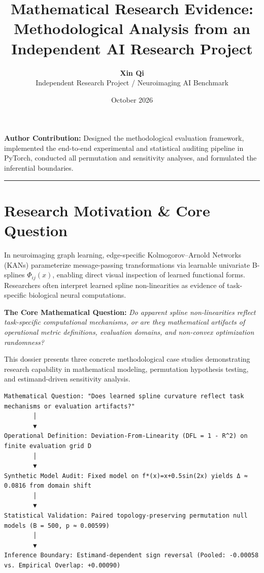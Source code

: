 \documentclass[11pt,a4paper]{article}
\title{\textbf{Mathematical Research Evidence: Methodological Analysis from an Independent AI Research Project}}
\author{\textbf{Xin Qi} \\ Independent Research Project / Neuroimaging AI Benchmark}
\date{October 2026}
\begin{document}
\maketitle

\noindent\textbf{Author Contribution:} Designed the methodological evaluation framework, implemented the end-to-end experimental and statistical auditing pipeline in PyTorch, conducted all permutation and sensitivity analyses, and formulated the inferential boundaries.

\vspace{0.8em}
\hrule
\vspace{1em}

\section{Research Motivation \& Core Question}
In neuroimaging graph learning, edge-specific Kolmogorov--Arnold Networks (KANs) parameterize message-passing transformations via learnable univariate B-splines $\Phi_{ij}(x)$, enabling direct visual inspection of learned functional forms. Researchers often interpret learned spline non-linearities as evidence of task-specific biological neural computations.

\textbf{The Core Mathematical Question:} \textit{Do apparent spline non-linearities reflect task-specific computational mechanisms, or are they mathematical artifacts of operational metric definitions, evaluation domains, and non-convex optimization randomness?}

This dossier presents three concrete methodological case studies demonstrating research capability in mathematical modeling, permutation hypothesis testing, and estimand-driven sensitivity analysis.

\begin{center}
\small
\begin{verbatim}
Mathematical Question: "Does learned spline curvature reflect task mechanisms or evaluation artifacts?"
        │
        ▼
Operational Definition: Deviation-From-Linearity (DFL = 1 - R^2) on finite evaluation grid D
        │
        ▼
Synthetic Model Audit: Fixed model on f*(x)=x+0.5sin(2x) yields Δ ≈ 0.0816 from domain shift
        │
        ▼
Statistical Validation: Paired topology-preserving permutation null models (B = 500, p ≈ 0.00599)
        │
        ▼
Inference Boundary: Estimand-dependent sign reversal (Pooled: -0.00058 vs. Empirical Overlap: +0.00090)
\end{verbatim}
\end{center}
\end{document}
